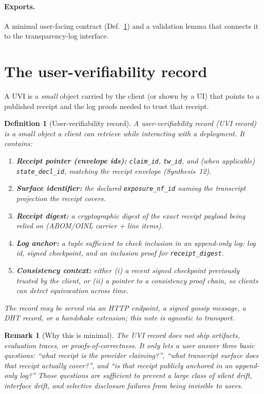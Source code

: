 \documentclass[11pt]{article}
\newtheorem{definition}{Definition}
\newtheorem{remark}{Remark}
\begin{document}
\paragraph{Exports.}
A minimal user-facing contract (Def.~\ref{def:uvir}) and a validation lemma that connects it to the transparency-log interface.

\section{The user-verifiability record}

A UVI is a \emph{small} object carried by the client (or shown by a UI) that points to a published receipt and the log proofs needed to trust that receipt.

\begin{definition}[User-verifiability record]\label{def:uvir}
A \emph{user-verifiability record} (UVI record) is a small object a client can retrieve while interacting with a deployment.
It contains:
\begin{enumerate}[leftmargin=*]
\item \textbf{Receipt pointer (envelope ids):} \texttt{claim\_id}, \texttt{tw\_id}, and (when applicable) \texttt{state\_decl\_id}, matching the receipt envelope (Synthesis~12).\cite{series:receiptitems}
\item \textbf{Surface identifier:} the declared \texttt{exposure\_nf\_id} naming the transcript projection the receipt covers.\cite{series:traceifaces}
\item \textbf{Receipt digest:} a cryptographic digest of the exact receipt payload being relied on (ABOM/OINL carrier + line items).\cite{series:abomoinl,series:receiptitems}
\item \textbf{Log anchor:} a tuple sufficient to check inclusion in an append-only log: log id, signed checkpoint, and an inclusion proof for \texttt{receipt\_digest}.\cite{series:transparencyprimitives}
\item \textbf{Consistency context:} either (i) a recent signed checkpoint previously trusted by the client, or (ii) a pointer to a consistency proof chain, so clients can detect equivocation across time.\cite{series:transparencyprimitives}
\end{enumerate}
The record may be served via an HTTP endpoint, a signed gossip message, a DHT record, or a handshake extension; this note is agnostic to transport.
\end{definition}

\begin{remark}[Why this is minimal]
The UVI record does \emph{not} ship artifacts, evaluation traces, or proofs-of-correctness.
It only lets a user answer three basic questions: ``what receipt is the provider claiming?'', ``what transcript surface does that receipt actually cover?'', and ``is that receipt publicly anchored in an append-only log?''
Those questions are sufficient to prevent a large class of \emph{silent drift}, \emph{interface drift}, and \emph{selective disclosure} failures from being invisible to users.
\end{remark}
\end{document}
